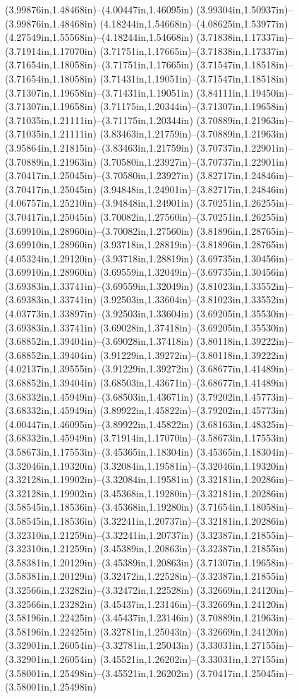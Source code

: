 (3.99876in,1.48468in)--(4.00447in,1.46095in) (3.99304in,1.50937in)--(3.99876in,1.48468in) (4.18244in,1.54668in)--(4.08625in,1.53977in) (4.27549in,1.55568in)--(4.18244in,1.54668in) (3.71838in,1.17337in)--(3.71914in,1.17070in) (3.71751in,1.17665in)--(3.71838in,1.17337in) (3.71654in,1.18058in)--(3.71751in,1.17665in) (3.71547in,1.18518in)--(3.71654in,1.18058in) (3.71431in,1.19051in)--(3.71547in,1.18518in) (3.71307in,1.19658in)--(3.71431in,1.19051in) (3.84111in,1.19450in)--(3.71307in,1.19658in) (3.71175in,1.20344in)--(3.71307in,1.19658in) (3.71035in,1.21111in)--(3.71175in,1.20344in) (3.70889in,1.21963in)--(3.71035in,1.21111in) (3.83463in,1.21759in)--(3.70889in,1.21963in) (3.95864in,1.21815in)--(3.83463in,1.21759in) (3.70737in,1.22901in)--(3.70889in,1.21963in) (3.70580in,1.23927in)--(3.70737in,1.22901in) (3.70417in,1.25045in)--(3.70580in,1.23927in) (3.82717in,1.24846in)--(3.70417in,1.25045in) (3.94848in,1.24901in)--(3.82717in,1.24846in) (4.06757in,1.25210in)--(3.94848in,1.24901in) (3.70251in,1.26255in)--(3.70417in,1.25045in) (3.70082in,1.27560in)--(3.70251in,1.26255in) (3.69910in,1.28960in)--(3.70082in,1.27560in) (3.81896in,1.28765in)--(3.69910in,1.28960in) (3.93718in,1.28819in)--(3.81896in,1.28765in) (4.05324in,1.29120in)--(3.93718in,1.28819in) (3.69735in,1.30456in)--(3.69910in,1.28960in) (3.69559in,1.32049in)--(3.69735in,1.30456in) (3.69383in,1.33741in)--(3.69559in,1.32049in) (3.81023in,1.33552in)--(3.69383in,1.33741in) (3.92503in,1.33604in)--(3.81023in,1.33552in) (4.03773in,1.33897in)--(3.92503in,1.33604in) (3.69205in,1.35530in)--(3.69383in,1.33741in) (3.69028in,1.37418in)--(3.69205in,1.35530in) (3.68852in,1.39404in)--(3.69028in,1.37418in) (3.80118in,1.39222in)--(3.68852in,1.39404in) (3.91229in,1.39272in)--(3.80118in,1.39222in) (4.02137in,1.39555in)--(3.91229in,1.39272in) (3.68677in,1.41489in)--(3.68852in,1.39404in) (3.68503in,1.43671in)--(3.68677in,1.41489in) (3.68332in,1.45949in)--(3.68503in,1.43671in) (3.79202in,1.45773in)--(3.68332in,1.45949in) (3.89922in,1.45822in)--(3.79202in,1.45773in) (4.00447in,1.46095in)--(3.89922in,1.45822in) (3.68163in,1.48325in)--(3.68332in,1.45949in) (3.71914in,1.17070in)--(3.58673in,1.17553in) (3.58673in,1.17553in)--(3.45365in,1.18304in) (3.45365in,1.18304in)--(3.32046in,1.19320in) (3.32084in,1.19581in)--(3.32046in,1.19320in) (3.32128in,1.19902in)--(3.32084in,1.19581in) (3.32181in,1.20286in)--(3.32128in,1.19902in) (3.45368in,1.19280in)--(3.32181in,1.20286in) (3.58545in,1.18536in)--(3.45368in,1.19280in) (3.71654in,1.18058in)--(3.58545in,1.18536in) (3.32241in,1.20737in)--(3.32181in,1.20286in) (3.32310in,1.21259in)--(3.32241in,1.20737in) (3.32387in,1.21855in)--(3.32310in,1.21259in) (3.45389in,1.20863in)--(3.32387in,1.21855in) (3.58381in,1.20129in)--(3.45389in,1.20863in) (3.71307in,1.19658in)--(3.58381in,1.20129in) (3.32472in,1.22528in)--(3.32387in,1.21855in) (3.32566in,1.23282in)--(3.32472in,1.22528in) (3.32669in,1.24120in)--(3.32566in,1.23282in) (3.45437in,1.23146in)--(3.32669in,1.24120in) (3.58196in,1.22425in)--(3.45437in,1.23146in) (3.70889in,1.21963in)--(3.58196in,1.22425in) (3.32781in,1.25043in)--(3.32669in,1.24120in) (3.32901in,1.26054in)--(3.32781in,1.25043in) (3.33031in,1.27155in)--(3.32901in,1.26054in) (3.45521in,1.26202in)--(3.33031in,1.27155in) (3.58001in,1.25498in)--(3.45521in,1.26202in) (3.70417in,1.25045in)--(3.58001in,1.25498in) 